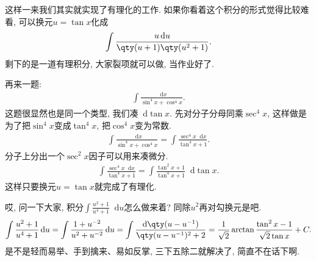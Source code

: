 \documentclass{ctexbook}
\newcommand*{\dif}{\mathop{}\!\mathrm{d}}
\begin{document}
{这样一来我们其实就实现了有理化的工作. 如果你看着这个积分的形式觉得比较难看, 可以换元$u=\tan{x}$化成
\begin{align*}
\int\frac{u\dif{u}}{\qty(u+1)\qty(u^{2}+1)}
.\end{align*}
剩下的是一道有理积分, 大家裂项就可以做, 当作业好了. \par
再来一题: 
\begin{align*}
\int\frac{\dif{x}}{\sin^{4}{x}+\cos^{4}{x}}
.\end{align*}
这题很显然也是同一个类型, 我们凑$\dif{\tan{x}}$. 先对分子分母同乘$\sec^{4}{x}$, 这样做是为了把$\sin^{4}{x}$变成$\tan^{4}{x}$, 把$\cos^{4}{x}$变为常数. 
\begin{align*}
\int\frac{\dif{x}}{\sin^{4}{x}+\cos^{4}{x}}=\int\frac{\sec^{4}{x}\dif{x}}{\tan^{4}{x}+1}
.\end{align*}
分子上分出一个$\sec^{2}{x}$因子可以用来凑微分. 
\begin{align*}
\int\frac{\sec^{4}{x}\dif{x}}{\tan^{4}{x}+1}=\int\frac{\tan^{2}{x}+1}{\tan^{4}{x}+1}\dif{\tan{x}}
.\end{align*}
这样只要换元$u=\tan{x}$就完成了有理化. \par
哎, 问一下大家, 积分$\int\frac{u^{2}+1}{u^{4}+1}\dif{u}$怎么做来着? 同除$u^{2}$再对勾换元是吧. 
\begin{align*}
\int\frac{u^{2}+1}{u^{4}+1}\dif{u}=\int\frac{1+u^{-2}}{u^{2}+u^{-2}}\dif{u}=\int\frac{\dif{\qty(u-u^{-1})}}{\qty(u-u^{-1})^{2}+2}=\frac{1}{\sqrt{2}}\arctan{\frac{\tan^{2}{x}-1}{\sqrt{2}\tan{x}}}+C
.\end{align*}
是不是轻而易举、手到擒来、易如反掌, 三下五除二就解决了, 简直不在话下啊. \par
}
\end{document}
